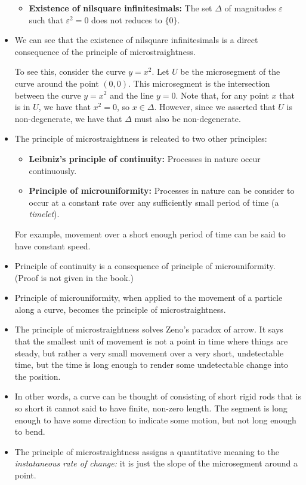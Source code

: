 \documentclass[10pt]{article}
\begin{document}
\begin{itemize}
\begin{itemize}
  		\item {\bf Existence of nilsquare infinitesimals:} The set $\Delta$ of magnitudes $\varepsilon$ such that $\varepsilon^2 = 0$ does not reduces to $\{ 0 \}$.
  	\end{itemize}

  	\item We can see that the existence of nilsquare infinitesimals is a direct consequence of the principle of microstraightness.

  	To see this, consider the curve $y = x^2$. Let $U$ be the microsegment of the curve around the point $(0,0)$. This microsegment is the intersection between the curve $y = x^2$ and the line $y = 0$. Note that, for any point $x$ that is in $U$, we have that $x^2 = 0$, so $x \in \Delta$. However, since we asserted that $U$ is non-degenerate, we have that $\Delta$ must also be non-degenerate.

  	\item The principle of microstraightness is releated to two other principles:
  	\begin{itemize}
  		\item {\bf Leibniz's principle of continuity:} Processes in nature occur continuously.
  		\item {\bf Principle of microuniformity:} Processes in nature can be consider to occur at a constant rate over any sufficiently small period of time (a \emph{timelet}).
  	\end{itemize}

  	For example, movement over a short enough period of time can be said to have constant speed.

  	\item Principle of continuity is a consequence of principle of microuniformity. (Proof is not given in the book.)

  	\item Principle of microuniformity, when applied to the movement of a particle along a curve, becomes the principle of microstraightness.

  	\item The principle of microstraightness solves Zeno's paradox of arrow. It says that the smallest unit of movement is not a point in time where things are steady, but rather a very small movement over a very short, undetectable time, but the time is long enough to render some undetectable change into the position.

  	\item In other words, a curve can be thought of consisting of short rigid rods that is so short it cannot said to have finite, non-zero length. The segment is long enough to have some direction to indicate some motion, but not long enough to bend.

  	\item The principle of microstraightness assigns a quantitative meaning to the \emph{instataneous rate of change:} it is just the slope of the microsegment around a point.
  \end{itemize}  
\end{document}
